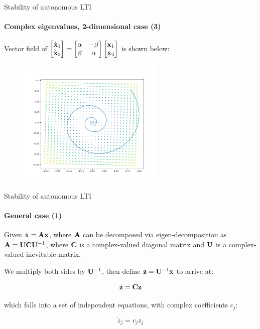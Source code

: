 \documentclass{beamer}
\begin{document}
\begin{frame}{Stability of autonomous LTI}
\framesubtitle{Complex eigenvalues, 2-dimensional case (3)}
\begin{flushleft}

Vector field of 
$\begin{bmatrix}
    \dot{\mathbf{x}}_1 \\ \dot{\mathbf{x}}_2
\end{bmatrix} 
=
\begin{bmatrix}
    \alpha & -\beta \\ \beta & \alpha
\end{bmatrix}     
\begin{bmatrix}
    \mathbf{x}_1 \\ \mathbf{x}_2
\end{bmatrix} $ 
is shown below:
%
\begin{figure}
    \centering
    \includegraphics[width=7cm]{Figure_1.png}%
    \label{fig:my_label}
\end{figure}

\end{flushleft}
\end{frame}



\begin{frame}{Stability of autonomous LTI}
\framesubtitle{General case (1)}
\begin{flushleft}

Given $\dot{\mathbf{x}} = \mathbf{A} \mathbf{x}$, where $\mathbf{A}$ can be decomposed via eigen-decomposition as $\mathbf{A} = \mathbf{U} \mathbf{C} \mathbf{U}^{-1}$, where $\mathbf{C}$ is a complex-valued diagonal matrix and $\mathbf{U}$ is a complex-valued inevitable matrix. 

\bigskip

We multiply both sides by $\mathbf{U}^{-1}$, then define $\mathbf{z} = \mathbf{U}^{-1} \mathbf{x}$ to arrive at:

\begin{equation}
    \dot{\mathbf{z}} = \mathbf{C} \mathbf{z}
\end{equation}

which falls into a set of independent equations, with complex coefficients $c_j$:

\begin{equation}
    \dot{z}_j = c_j z_j
\end{equation}

\end{flushleft}
\end{frame}
\end{document}
